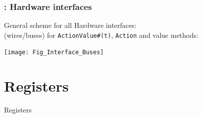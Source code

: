 
\begin{frame}
\frametitle{{\BSV}: Hardware interfaces}

\footnotesize

General scheme for all {\BSV} Hardware interfaces: \\
\hmm (wires/buses) for {\tt ActionValue\#(t)}, {\tt Action} and value methods:

\vspace{2ex}

\begin{center}
\texttt{[image: Fig\_Interface\_Buses]}
\end{center}

\end{frame}


\section{Registers}


\begin{frame}

\begin{center}
  {\LARGE Registers}
\end{center}

\end{frame}



